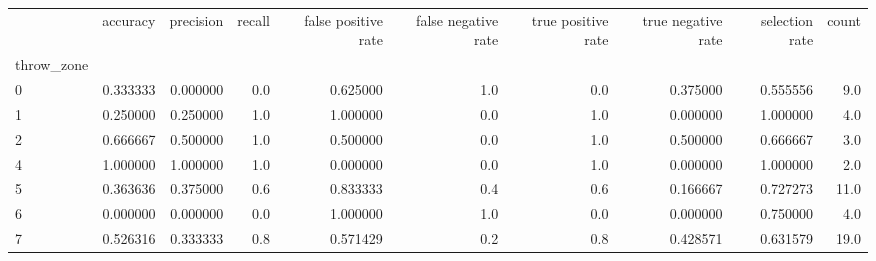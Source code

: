 \begin{tabular}{lrrrrrrrrr}
\toprule
{} &  accuracy &  precision &  recall &  false positive rate &  false negative rate &  true positive rate &  true negative rate &  selection rate &  count \\
throw\_zone &           &            &         &                      &                      &                     &                     &                 &        \\
\midrule
0          &  0.333333 &   0.000000 &     0.0 &             0.625000 &                  1.0 &                 0.0 &            0.375000 &        0.555556 &    9.0 \\
1          &  0.250000 &   0.250000 &     1.0 &             1.000000 &                  0.0 &                 1.0 &            0.000000 &        1.000000 &    4.0 \\
2          &  0.666667 &   0.500000 &     1.0 &             0.500000 &                  0.0 &                 1.0 &            0.500000 &        0.666667 &    3.0 \\
4          &  1.000000 &   1.000000 &     1.0 &             0.000000 &                  0.0 &                 1.0 &            0.000000 &        1.000000 &    2.0 \\
5          &  0.363636 &   0.375000 &     0.6 &             0.833333 &                  0.4 &                 0.6 &            0.166667 &        0.727273 &   11.0 \\
6          &  0.000000 &   0.000000 &     0.0 &             1.000000 &                  1.0 &                 0.0 &            0.000000 &        0.750000 &    4.0 \\
7          &  0.526316 &   0.333333 &     0.8 &             0.571429 &                  0.2 &                 0.8 &            0.428571 &        0.631579 &   19.0 \\
\bottomrule
\end{tabular}
